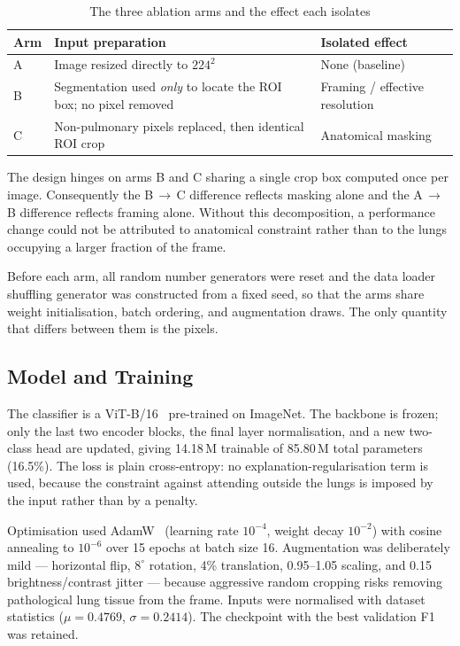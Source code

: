 \documentclass[journal,twoside,web]{ieeecolor}
\begin{document}
\begin{table}[!t]
\caption{The three ablation arms and the effect each isolates}
\label{tab:arms}
\centering
\small
\begin{tabular}{@{}p{}p{}p{}@{}}
\toprule
\textbf{Arm} & \textbf{Input preparation} & \textbf{Isolated effect} \\
\midrule
A & Image resized directly to $224^2$ & None (baseline) \\
B & Segmentation used \emph{only} to locate the ROI box; no pixel removed & Framing / effective resolution \\
C & Non-pulmonary pixels replaced, then identical ROI crop & Anatomical masking \\
\bottomrule
\end{tabular}
\end{table}

The design hinges on arms B and C sharing a single crop box computed once per image. Consequently the B\,$\rightarrow$\,C difference reflects masking alone and the A\,$\rightarrow$\,B difference reflects framing alone. Without this decomposition, a performance change could not be attributed to anatomical constraint rather than to the lungs occupying a larger fraction of the frame.

Before each arm, all random number generators were reset and the data loader shuffling generator was constructed from a fixed seed, so that the arms share weight initialisation, batch ordering, and augmentation draws. The only quantity that differs between them is the pixels.

\subsection{Model and Training}
\label{sec:model}

The classifier is a ViT-B/16~\cite{dosovitskiy2021} pre-trained on ImageNet. The backbone is frozen; only the last two encoder blocks, the final layer normalisation, and a new two-class head are updated, giving 14.18\,M trainable of 85.80\,M total parameters (16.5\%). The loss is plain cross-entropy: no explanation-regularisation term is used, because the constraint against attending outside the lungs is imposed by the input rather than by a penalty.

Optimisation used AdamW~\cite{loshchilov2019} (learning rate $10^{-4}$, weight decay $10^{-2}$) with cosine annealing to $10^{-6}$ over 15 epochs at batch size 16. Augmentation was deliberately mild --- horizontal flip, $8^{\circ}$ rotation, 4\% translation, 0.95--1.05 scaling, and 0.15 brightness/contrast jitter --- because aggressive random cropping risks removing pathological lung tissue from the frame. Inputs were normalised with dataset statistics ($\mu=0.4769$, $\sigma=0.2414$). The checkpoint with the best validation F1 was retained.
\end{document}
